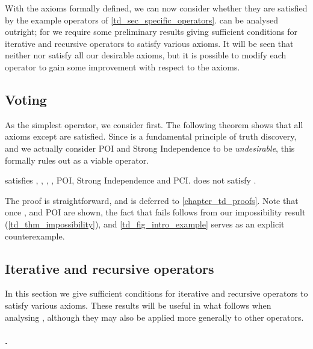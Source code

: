 With the axioms formally defined, we can now consider whether they are
satisfied by the example operators of \cref{td_sec_specific_operators}.
\voting{} can be analysed outright; for \sums{} we require some preliminary
results giving sufficient conditions for iterative and recursive operators to
satisfy various axioms. It will be seen that neither \voting{} nor \sums{}
satisfy all our desirable axioms, but it is possible to modify each operator to
gain some improvement with respect to the axioms.

\subsection{Voting}

As the simplest operator, we consider \voting{} first. The following
theorem shows that all axioms except \coherence{} are satisfied. Since
\coherence{}
is a fundamental principle of truth discovery, and we actually consider POI and
Strong Independence to be \emph{undesirable}, this formally rules out \voting{} as a
viable operator.

\begin{theorem}
\label{td_thm_voting_axioms}
    \voting{} satisfies \symmetry{}, \unanimity{}, \groundedness{},
    \monotonicity{}, POI, Strong
    Independence and PCI. \voting{} does not satisfy \coherence{}.
\end{theorem}

The proof is straightforward, and is deferred to \cref{chapter_td_proofs}.  Note that
once \symmetry{}, \monotonicity{} and POI are shown, the fact that \voting{} fails
\coherence{} follows from our impossibility result (\cref{td_thm_impossibility}), and
\cref{td_fig_intro_example} serves as an explicit counterexample.

\subsection{Iterative and recursive operators}
\label{td_sec_axioms_for_iterative_and_recursive_operators}

In this section we give sufficient conditions for iterative and recursive
operators to satisfy various axioms. These results will be useful in what
follows when analysing \sums{}, although they may also be applied more
generally to other operators.

\paragraph{\coherence{}.}

